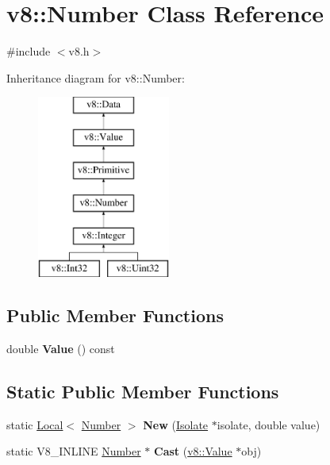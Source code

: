 \hypertarget{classv8_1_1_number}{}\section{v8\+:\+:Number Class Reference}
\label{classv8_1_1_number}


{\ttfamily \#include $<$v8.\+h$>$}

Inheritance diagram for v8\+:\+:Number\+:\begin{figure}[H]
\begin{center}
\leavevmode
\includegraphics[height=6.000000cm]{classv8_1_1_number}
\end{center}
\end{figure}
\subsection*{Public Member Functions}
\begin{DoxyCompactItemize}
\item 
double {\bfseries Value} () const \hypertarget{classv8_1_1_number_ae7ca1af5dd34a7a32a69f57a910ab269}{}\label{classv8_1_1_number_ae7ca1af5dd34a7a32a69f57a910ab269}

\end{DoxyCompactItemize}
\subsection*{Static Public Member Functions}
\begin{DoxyCompactItemize}
\item 
static \hyperlink{classv8_1_1_local}{Local}$<$ \hyperlink{classv8_1_1_number}{Number} $>$ {\bfseries New} (\hyperlink{classv8_1_1_isolate}{Isolate} $\ast$isolate, double value)\hypertarget{classv8_1_1_number_a4d8822be251214dab4cf0212475ede76}{}\label{classv8_1_1_number_a4d8822be251214dab4cf0212475ede76}

\item 
static V8\+\_\+\+I\+N\+L\+I\+NE \hyperlink{classv8_1_1_number}{Number} $\ast$ {\bfseries Cast} (\hyperlink{classv8_1_1_value}{v8\+::\+Value} $\ast$obj)\hypertarget{classv8_1_1_number_a053d48e0003104308963a4a7e3881912}{}\label{classv8_1_1_number_a053d48e0003104308963a4a7e3881912}

\end{DoxyCompactItemize}
